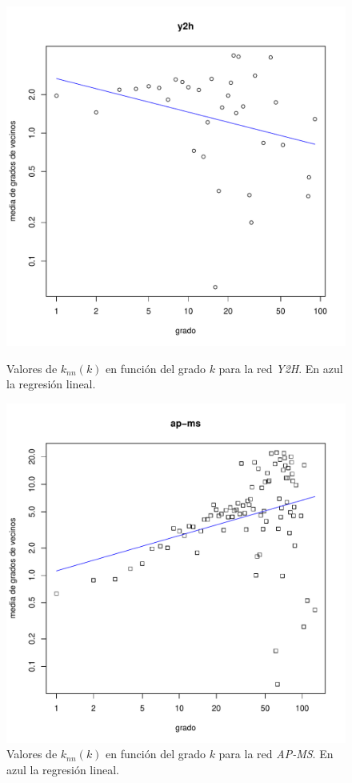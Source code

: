\documentclass{article}
\begin{document}
\begin{figure}[!htb]
\centering
   \begin{minipage}{0.4\textwidth}
	\centering
	\includegraphics[width=1.0\linewidth]{Imagenes_P4/ej46}
	\caption{Valores de $k_{nn}(k)$ en función del grado $k$ para la red \textit{Y2H}. En azul la regresión lineal.}
	\label{pt4y2h}
   \end{minipage}
   \hspace{50px}
   \begin{minipage}{0.4\textwidth}
	\centering
	\includegraphics[width=1.0\linewidth]{Imagenes_P4/ej48}
	\caption{Valores de $k_{nn}(k)$ en función del grado $k$ para la red \textit{AP-MS}. En azul la regresión lineal.}
	\label{pt4apms}
   \end{minipage}
\end{figure}
\end{document}
